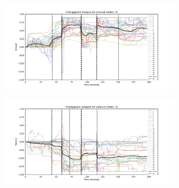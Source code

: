 \documentclass[11pt, letterpaper]{article}
\begin{document}
\begin{figure}
        \centering
    \begin{subfigure}[t]{0.49\textwidth}
        \centering
        \includegraphics[width=\linewidth]{changepoints_V7_arousal_avg_all_data} 
        \caption{} \label{fig:changepoints_V7_arousal_avg_all_data}
    \end{subfigure}
    \hfill
    \begin{subfigure}[t]{0.49\textwidth}
        \centering
        \includegraphics[width=\linewidth]{changepoints_V7_valence_avg_all_data} 
        \caption{} \label{fig:changepoints_V7_valence_avg_all_data}
    \end{subfigure}

    \vspace{1cm}
    

\end{figure}
\end{document}
